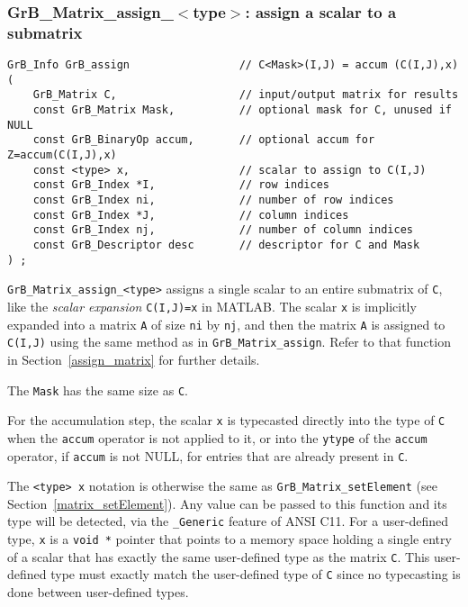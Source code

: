 \documentclass[12pt]{article}
\begin{document}
\subsubsection{{\sf GrB\_Matrix\_assign\_$<$type$>$:} assign a scalar to a submatrix}
\label{assign_matrix_scalar}

\begin{mdframed}[userdefinedwidth=6in]
{\footnotesize
\begin{verbatim}
GrB_Info GrB_assign                 // C<Mask>(I,J) = accum (C(I,J),x)
(
    GrB_Matrix C,                   // input/output matrix for results
    const GrB_Matrix Mask,          // optional mask for C, unused if NULL
    const GrB_BinaryOp accum,       // optional accum for Z=accum(C(I,J),x)
    const <type> x,                 // scalar to assign to C(I,J)
    const GrB_Index *I,             // row indices
    const GrB_Index ni,             // number of row indices
    const GrB_Index *J,             // column indices
    const GrB_Index nj,             // number of column indices
    const GrB_Descriptor desc       // descriptor for C and Mask
) ;
\end{verbatim} } \end{mdframed}

\verb'GrB_Matrix_assign_<type>' assigns a single scalar to an entire
submatrix of \verb'C', like the {\em scalar expansion} \verb'C(I,J)=x' in
MATLAB.  The scalar \verb'x' is implicitly expanded into a matrix \verb'A' of
size \verb'ni' by \verb'nj', and then the matrix \verb'A' is assigned to
\verb'C(I,J)' using the same method as in \verb'GrB_Matrix_assign'.  Refer
to that function in Section~\ref{assign_matrix} for further details.

The \verb'Mask' has the same size as \verb'C'.

For the accumulation step, the scalar \verb'x' is typecasted directly into the
type of \verb'C' when the \verb'accum' operator is not applied to it, or into
the \verb'ytype' of the \verb'accum' operator, if \verb'accum' is not NULL, for
entries that are already present in \verb'C'.

The \verb'<type> x' notation is otherwise the same as
\verb'GrB_Matrix_setElement' (see Section~\ref{matrix_setElement}).  Any value
can be passed to this function and its type will be detected, via the
\verb'_Generic' feature of ANSI C11.  For a user-defined type, \verb'x' is a
\verb'void *' pointer that points to a memory space holding a single entry of a
scalar that has exactly the same user-defined type as the matrix \verb'C'.
This user-defined type must exactly match the user-defined type of \verb'C'
since no typecasting is done between user-defined types.
\end{document}

